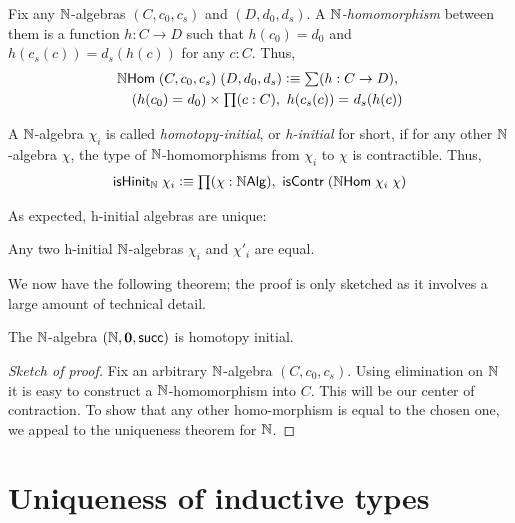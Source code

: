 \begin{defn}
Fix any $\mathbb{N}$-algebras $(C,c_0,c_s)$ and $(D,d_0,d_s)$. A \emph{$\mathbb{N}$-homomorphism} between them is a function $h : C \to D$ such that $h(c_0) = d_0$ and $h(c_s(c)) = d_s(h(c))$ for any $c : C$. Thus,
\begin{align*}
\nhom \; (C,c_0,c_s) \; (D,d_0,d_s) \defeq \sm {h : C \to D} \\ (\id{h(c_0)}{d_0}) \times \prd{c:C} \id{h(c_s(c))}{d_s(h(c))}
\end{align*}
\end{defn}

\begin{defn}
A $\mathbb{N}$-algebra $\chi_i$ is called \emph{homotopy-initial}, or \emph{h-initial} for short, if for any other $\mathbb{N}$-algebra $\chi$, the type of $\mathbb{N}$-homomorphisms from $\chi_i$ to $\chi$ is contractible. Thus,
\begin{align*}
\ishinitn \; \chi_i \defeq \prd{\chi : \nalg} \iscontr \; (\nhom \; \chi_i\; \chi)
\end{align*}
\end{defn}

As expected, h-initial algebras are unique:
\begin{thm}
Any two h-initial $\mathbb{N}$-algebras $\chi_i$ and $\chi'_i$ are equal.
\end{thm}

We now have the following theorem; the proof is only sketched as it involves a large amount of technical detail.
\begin{thm}\label{thm:nat-hinitial}
The $\mathbb{N}$-algebra $(\mathbb{N}, \mathbf{0}, \mathsf{succ})$ is homotopy initial.
\end{thm}
\begin{proof}[Sketch of proof]
Fix an arbitrary $\mathbb{N}$-algebra $(C,c_0,c_s)$. Using elimination on $\mathbb{N}$ it is easy to construct a $\mathbb{N}$-homomorphism into $C$. This will be our
center of contraction. To show that any other homo-morphism is equal to the chosen one, we appeal to the uniqueness theorem for $\mathbb{N}$.
\end{proof}



\section{Uniqueness of inductive types}
\label{sec:appetizer-univalence}

\newcommand{\natp}{\ensuremath{\nat'}\xspace}
\newcommand{\zp}{\ensuremath{0'}\xspace}
\newcommand{\Sp}{\ensuremath{\suc'}\xspace}
\newcommand{\dblp}{\ensuremath{\mathbf{double'}}}


